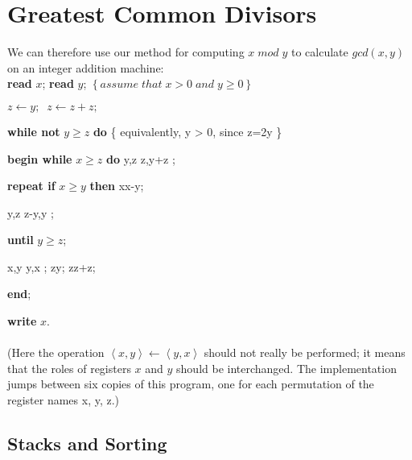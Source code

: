 \documentclass{article}
\begin{document}
\begin{multicols}{3}
  
\section*{Greatest Common Divisors}
We can therefore use our method for computing $x\; mod\; y$ to calculate $gcd(x, y)$ on an integer addition machine:\\
    
    \textbf{read} $x$; \textbf{read} $y$; $\left \{ assume\; that\; x>0 \; and \; y\geq 0 \right \}$
    
    $z\leftarrow y;\;\; z\leftarrow z+z;$
    
    \textbf{while not} $y\geq z$ \textbf{do} \left \{ equivalently,\; y > 0,\; since\; z=2y \right \}
    
    \hspace {.5cm}\textbf{begin while} $ x\geq z$ \textbf{do} \left \langle y,z \right \rangle\leftarrow \left \langle z,y+z \right \rangle;
    
    \hspace {.5cm}\textbf{repeat if} $ x\geq y$ \textbf{then} x\leftarrow x-y;
    
    \hspace {1cm}\left \langle y,z \right \rangle\leftarrow \left \langle z-y,y \right \rangle;
    
    \hspace {.5cm}\textbf{until }$ y\geq z$;
    
    \hspace {.5cm}\left \langle x,y \right \rangle\leftarrow \left \langle y,x \right \rangle; z\leftarrow y; z\leftarrow z+z;
    
    \hspace {.5cm}\textbf{end};
    
    \textbf{write} \;$x$.\\\\
(Here\; the\; operation\; $\left \langle x,y \right \rangle \leftarrow \left \langle y,x \right \rangle$ should not really be performed; it means that the roles of registers $x$ and $y$ should be interchanged. The implementation jumps between six copies of this program, one for
each permutation of the register names x, y, z.)\\


\noindent
\colorbox{marronrp3}{
  \begin{minipage}[t]{.96\linewidth}
    \vspace{.2cm}
    \section*{Stacks and Sorting}
    \vspace{.05cm}\\
    

\end{minipage}}
\end{multicols}
\end{document}
